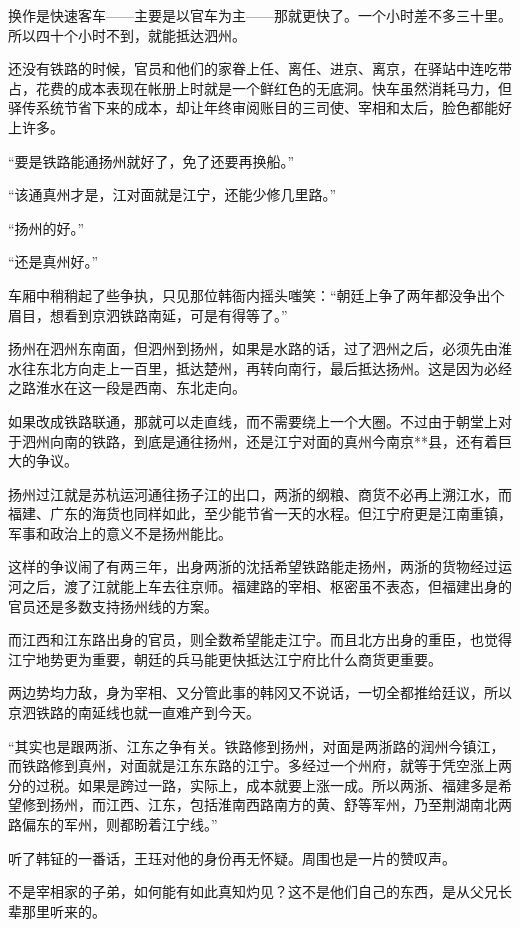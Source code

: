 换作是快速客车——主要是以官车为主——那就更快了。一个小时差不多三十里。所以四十个小时不到，就能抵达泗州。

还没有铁路的时候，官员和他们的家眷上任、离任、进京、离京，在驿站中连吃带占，花费的成本表现在帐册上时就是一个鲜红色的无底洞。快车虽然消耗马力，但驿传系统节省下来的成本，却让年终审阅账目的三司使、宰相和太后，脸色都能好上许多。

“要是铁路能通扬州就好了，免了还要再换船。”

“该通真州才是，江对面就是江宁，还能少修几里路。”

“扬州的好。”

“还是真州好。”

车厢中稍稍起了些争执，只见那位韩衙内摇头嗤笑：“朝廷上争了两年都没争出个眉目，想看到京泗铁路南延，可是有得等了。”

扬州在泗州东南面，但泗州到扬州，如果是水路的话，过了泗州之后，必须先由淮水往东北方向走上一百里，抵达楚州，再转向南行，最后抵达扬州。这是因为必经之路淮水在这一段是西南、东北走向。

如果改成铁路联通，那就可以走直线，而不需要绕上一个大圈。不过由于朝堂上对于泗州向南的铁路，到底是通往扬州，还是江宁对面的真州今南京**县，还有着巨大的争议。

扬州过江就是苏杭运河通往扬子江的出口，两浙的纲粮、商货不必再上溯江水，而福建、广东的海货也同样如此，至少能节省一天的水程。但江宁府更是江南重镇，军事和政治上的意义不是扬州能比。

这样的争议闹了有两三年，出身两浙的沈括希望铁路能走扬州，两浙的货物经过运河之后，渡了江就能上车去往京师。福建路的宰相、枢密虽不表态，但福建出身的官员还是多数支持扬州线的方案。

而江西和江东路出身的官员，则全数希望能走江宁。而且北方出身的重臣，也觉得江宁地势更为重要，朝廷的兵马能更快抵达江宁府比什么商货更重要。

两边势均力敌，身为宰相、又分管此事的韩冈又不说话，一切全都推给廷议，所以京泗铁路的南延线也就一直难产到今天。

“其实也是跟两浙、江东之争有关。铁路修到扬州，对面是两浙路的润州今镇江，而铁路修到真州，对面就是江东东路的江宁。多经过一个州府，就等于凭空涨上两分的过税。如果是跨过一路，实际上，成本就要上涨一成。所以两浙、福建多是希望修到扬州，而江西、江东，包括淮南西路南方的黄、舒等军州，乃至荆湖南北两路偏东的军州，则都盼着江宁线。”

听了韩钲的一番话，王珏对他的身份再无怀疑。周围也是一片的赞叹声。

不是宰相家的子弟，如何能有如此真知灼见？这不是他们自己的东西，是从父兄长辈那里听来的。

